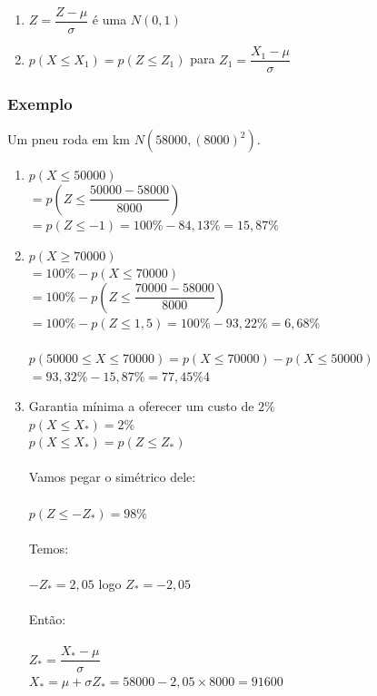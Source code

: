 \documentclass[a4paper]{article}
\begin{document}
	\begin{enumerate}
		\item $Z = \dfrac{Z-\mu}{\sigma}$ é uma $N(0,1)$
		\item $p(X \leq X_1) = p(Z \leq Z_1)$ para $Z_1 = \dfrac{X_1 - \mu}{\sigma}$
	\end{enumerate}

	\subsubsection{Exemplo}
	
	Um pneu roda em km $N\left(58000, (8000)^2\right)$.
	
	\begin{enumerate}[label=\alph*.]
		\item $p(X \leq 50000)$ \\
		$= p\left(Z \leq \dfrac{50000 - 58000}{8000}\right)$ \\
		$= p(Z \leq -1) = 100\% - 84,13\% = 15,87\%$
		\item $p(X \geq 70000)$ \\
		$=100\% - p(X \leq 70000)$ \\
		$=100\% - p\left( Z \leq \dfrac{70000 - 58000}{8000} \right)$ \\
		$= 100\% - p(Z \leq 1,5) = 100\% - 93,22\% = 6,68\%$ \\ \\
		$p(50000 \leq X \leq 70000) = p(X \leq 70000) - p(X \leq 50000)$ \\
		$= 93,32\% - 15,87\% = 77,45\%$4
		\item Garantia mínima a oferecer um custo de $2\%$ \\
		$p(X \leq X_*) = 2\%$ \\
		$p(X \leq X_*) = p(Z \leq Z_*)$ \\
		\\
		Vamos pegar o simétrico dele: \\
		\\
		$p(Z \leq -Z_*) = 98\%$ \\
		\\
		Temos: \\
		\\
		$-Z_* = 2,05$ logo $Z_* = -2,05$ \\
		\\
		Então: \\
		\\
		$Z_* = \dfrac{X_* - \mu}{\sigma}$ \\
		$X_* = \mu + \sigma Z_* = 58000 - 2,05 \times 8000 = 91600$
	\end{enumerate}
	
\end{document}
